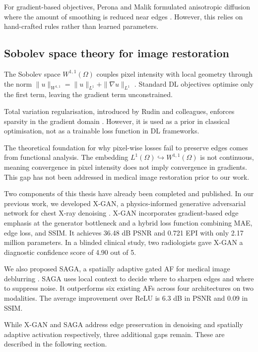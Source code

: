 For gradient-based objectives, Perona and Malik formulated anisotropic diffusion where the amount of smoothing is reduced near edges \citep{perona1990scale}. However, this relies on hand-crafted rules rather than learned parameters.

\subsection{Sobolev space theory for image restoration}

The Sobolev space \(W^{1,1}(\Omega)\) couples pixel intensity with local geometry through the norm \(\|u\|_{W^{1,1}} = \|u\|_{L^1} + \|\nabla u\|_{L^1}\) \citep{adams2003sobolev, evans2010partial}. Standard DL objectives optimise only the first term, leaving the gradient term unconstrained.

Total variation regularisation, introduced by Rudin and colleagues, enforces sparsity in the gradient domain \citep{rudin1992nonlinear}. However, it is used as a prior in classical optimisation, not as a trainable loss function in DL frameworks.

The theoretical foundation for why pixel-wise losses fail to preserve edges comes from functional analysis. The embedding \(L^1(\Omega) \hookrightarrow W^{1,1}(\Omega)\) is not continuous, meaning convergence in pixel intensity does not imply convergence in gradients. This gap has not been addressed in medical image restoration prior to our work.


Two components of this thesis have already been completed and published.
In our previous work, we developed X-GAN, a physics-informed generative adversarial network for chest X-ray denoising \citep{siju2026xgan}. X-GAN incorporates gradient-based edge emphasis at the generator bottleneck and a hybrid loss function combining MAE, edge loss, and SSIM. It achieves 36.48 dB PSNR and 0.721 EPI with only 2.17 million parameters. In a blinded clinical study, two radiologists gave X-GAN a diagnostic confidence score of 4.90 out of 5.

We also proposed SAGA, a spatially adaptive gated AF for medical image deblurring \citep{siju2026saga}. SAGA uses local context to decide where to sharpen edges and where to suppress noise. It outperforms six existing AFs across four architectures on two modalities. The average improvement over ReLU is 6.3 dB in PSNR and 0.09 in SSIM.

While X-GAN and SAGA address edge preservation in denoising and spatially adaptive activation respectively, three additional gaps remain. These are described in the following section.
